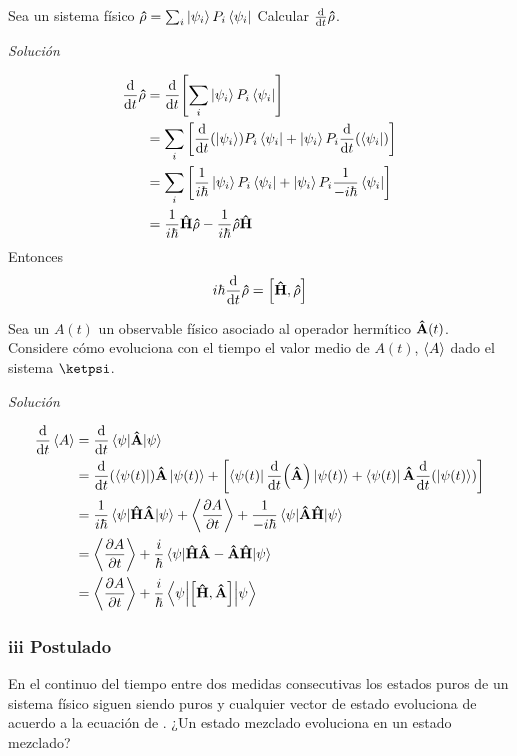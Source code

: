 \begin{example}
    Sea un sistema físico $\vu{\rho}=\sum_i \ket{\psi_i}P_i\bra{\psi_i}$ Calcular $\dv{t}\vu{\rho}$.

    \textit{Solución}
    
    \begin{align*}
        \dv{t}\vu{\rho}&= \dv{t}\qty[\sum_i \ket{\psi_i}P_i\bra{\psi_i}]\\
        &=\sum_i \qty[\dv{t}(\ket{\psi_i})P_i\bra{\psi_i} + \ket{\psi_i}P_i\dv{t}(\bra{\psi_i})]\\
        &=\sum_i \qty[\frac{1}{i\hbar}\ket{\psi_i}P_i\bra{\psi_i} + \ket{\psi_i}P_i\frac{1}{-i\hbar}\bra{\psi_i}]\\
        &=\frac{1}{i\hbar}\vu{H}\vu{\rho}-\frac{1}{i\hbar}\vu{\rho}\vu{H}
    \end{align*}
    Entonces
    $$
    i\hbar \dv{t}\vu{\rho}=\comm{\vu{H}}{\vu{\rho}}
    $$   
\end{example}

\begin{example}
    Sea un $A(t)$ un observable físico asociado al operador hermítico $\vu{A}(t)$. Considere cómo evoluciona con el tiempo el valor medio de $A(t)$, $\expval{A}$  dado el sistema $\ketpsi$.
    
    \textit{Solución}
    
    
    \begin{align*}
        \dv{t}\expval{A}&=  \dv{t}\ev{\vu{A}}{\psi} \\
         &=\dv{t}(\bra{\psi(t)})\vu{A}\ket{\psi(t)}+\qty[ \bra{\psi(t)}\dv{t}(\vu{A})\ket{\psi(t)}+\bra{\psi(t)}\vu{A}\dv{t}(\ket{\psi(t)})] \\
         &=\frac{1}{i\hbar}\ev{\vu{H}\vu{A}}{\psi}+\expval{\pdv{A}{t}}+\frac{1}{-i\hbar}\ev{\vu{A}\vu{H}}{\psi}\\
         &=\expval{\pdv{A}{t}}+\frac{i}{\hbar}\ev{\vu{H}\vu{A}-\vu{A}\vu{H}}{\psi}\\
         &=\expval{\pdv{A}{t}}+\frac{i}{\hbar}\ev**{\comm{\vu{H}}{\vu{A}}}{\psi}
    \end{align*}

\end{example}

\subsubsection{iii Postulado}

En el continuo del tiempo entre dos medidas consecutivas los estados puros de un sistema físico siguen siendo puros y cualquier vector de estado \ketpsi evoluciona de acuerdo a la ecuación de \perSch. ¿Un estado mezclado evoluciona en un estado mezclado?